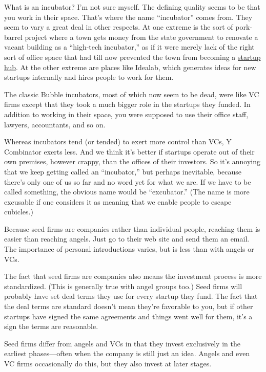 \documentclass[12pt]{book}
\begin{document}
What is an incubator? I'm not sure myself. The defining quality seems to
be that you work in their space. That's where the name ``incubator''
comes from. They seem to vary a great deal in other respects. At one
extreme is the sort of pork-barrel project where a town gets money from
the state government to renovate a vacant building as a ``high-tech
incubator,'' as if it were merely lack of the right sort of office space
that had till now prevented the town from becoming a
\href{siliconvalley.html}{startup hub}. At the other extreme are places
like Idealab, which generates ideas for new startups internally and
hires people to work for them.

The classic Bubble incubators, most of which now seem to be dead, were
like VC firms except that they took a much bigger role in the startups
they funded. In addition to working in their space, you were supposed to
use their office staff, lawyers, accountants, and so on.

Whereas incubators tend (or tended) to exert more control than VCs, Y
Combinator exerts less. And we think it's better if startups operate out
of their own premises, however crappy, than the offices of their
investors. So it's annoying that we keep getting called an
``incubator,'' but perhaps inevitable, because there's only one of us so
far and no word yet for what we are. If we have to be called something,
the obvious name would be ``excubator.'' (The name is more excusable if
one considers it as meaning that we enable people to escape cubicles.)

Because seed firms are companies rather than individual people, reaching
them is easier than reaching angels. Just go to their web site and send
them an email. The importance of personal introductions varies, but is
less than with angels or VCs.

The fact that seed firms are companies also means the investment process
is more standardized. (This is generally true with angel groups too.)
Seed firms will probably have set deal terms they use for every startup
they fund. The fact that the deal terms are standard doesn't mean
they're favorable to you, but if other startups have signed the same
agreements and things went well for them, it's a sign the terms are
reasonable.

Seed firms differ from angels and VCs in that they invest exclusively in
the earliest phases---often when the company is still just an idea.
Angels and even VC firms occasionally do this, but they also invest at
later stages.
\end{document}
